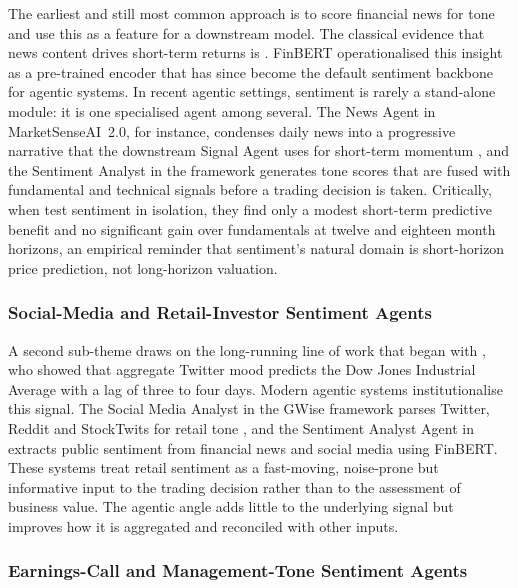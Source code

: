 The earliest and still most common approach is to score financial
news for tone and use this as a feature for a downstream model. The
classical evidence that news content drives short-term returns is
\citet{tetlock2007}. FinBERT \citep{huang2023finbert} operationalised
this insight as a pre-trained encoder that has since become the
default sentiment backbone for agentic systems. In recent agentic
settings, sentiment is rarely a stand-alone module: it is one
specialised agent among several. The News Agent in MarketSenseAI~2.0,
for instance, condenses daily news into a progressive narrative that
the downstream Signal Agent uses for short-term momentum
\citep{Fatouros2025MarketSense}, and the Sentiment Analyst in the
\citet{Cheng2025} framework generates tone scores that are fused with
fundamental and technical signals before a trading decision is taken.
Critically, when \citet{Papasotiriou2024} test sentiment in
isolation, they find only a modest short-term predictive benefit and
no significant gain over fundamentals at twelve and eighteen month
horizons, an empirical reminder that sentiment's natural domain
is short-horizon price prediction, not long-horizon valuation.

\subsubsection{Social-Media and Retail-Investor Sentiment Agents}
\label{sec:socialsentiment}

A second sub-theme draws on the long-running line of work that began
with \citet{bollen2011}, who showed that aggregate Twitter mood
predicts the Dow Jones Industrial Average with a lag of three to four
days. Modern agentic systems institutionalise this signal. The Social
Media Analyst in the GWise framework parses Twitter, Reddit and
StockTwits for retail tone \citep{rezaei2025gwise}, and the Sentiment
Analyst Agent in \citet{mattaparty2025} extracts public sentiment
from financial news and social media using FinBERT. These systems
treat retail sentiment as a fast-moving, noise-prone but informative
input to the trading decision rather than to the assessment of
business value. The agentic angle adds little to the underlying
signal but improves how it is aggregated and reconciled with other
inputs.

\subsubsection{Earnings-Call and Management-Tone Sentiment Agents}
\label{sec:earningssentiment}

